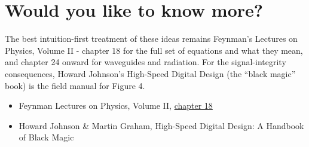 \section{Would you like to know
more?}\label{would-you-like-to-know-more}

The best intuition-first treatment of these ideas remains Feynman's
Lectures on Physics, Volume II - chapter 18 for the full set of
equations and what they mean, and chapter 24 onward for waveguides and
radiation. For the signal-integrity consequences, Howard Johnson's
High-Speed Digital Design (the ``black magic'' book) is the field manual
for Figure 4.

\begin{itemize}
\tightlist
\item
  Feynman Lectures on Physics, Volume II,
  \href{https://www.feynmanlectures.caltech.edu/II_18.html}{chapter 18}
\item
  Howard Johnson \& Martin Graham, High-Speed Digital Design: A Handbook
  of Black Magic
\end{itemize}
